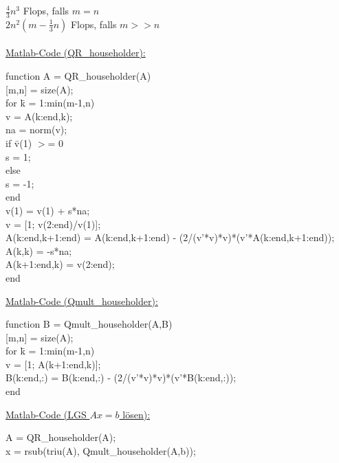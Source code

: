 \documentclass[4pt,a4paper]{scrartcl}
\begin{document}
\begin{multicols}{4}
$\frac{4}{3}n^3$ Flops, falls $m=n$\\
$2n^2\left(m-\frac{1}{3}n\right)$ Flops, falls $m>>n$\\\\
\underline{Matlab-Code (QR\_householder):}
\begin{tabbing}
function A = QR\_householder(A)\\
{[}m,n] = size(A);\\
for \=k = 1:min(m-1,n)\\
    \>v = A(k:end,k);\\
    \>na = norm(v);\\
    \>if \=v(1) $>$= 0\\
    \>   \>s = 1;\\
    \>else\\
    \>    \>s = -1;\\
    \>end  \\
    \>v(1) = v(1) + s*na;\\
    \>v = [1; v(2:end)/v(1)];\\
    \>A(k:end,k+1:end) = A(k:end,k+1:end) - (2/(v'*v)*v)*(v'*A(k:end,k+1:end));\\
    \>A(k,k) = -s*na;\\
    \>A(k+1:end,k) = v(2:end);\\
end
\end{tabbing}
\underline{Matlab-Code (Qmult\_householder):}
\begin{tabbing}
function B = Qmult\_householder(A,B)\\
{[}m,n] = size(A);\\
for \=k = 1:min(m-1,n)\\
    \>v = [1; A(k+1:end,k)];\\
    \>B(k:end,:) = B(k:end,:) - (2/(v'*v)*v)*(v'*B(k:end,:));\\
end
\end{tabbing}
\underline{Matlab-Code (LGS $Ax=b$ lösen):}
\begin{tabbing}
A = QR\_householder(A);\\
x = rsub(triu(A), Qmult\_householder(A,b));
\end{tabbing}



\end{multicols}
\end{document}
